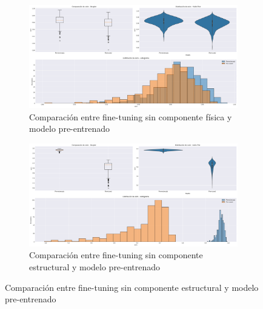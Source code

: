 \begin{figure}[H]
    \centering
    \begin{subfigure}[b]{0.48\textwidth}
        \centering
        \includegraphics[width=\textwidth]{Images/comparison_plots_ssim_no_phy.png}
        \caption{Comparación entre fine-tuning sin componente física y modelo pre-entrenado}
        \label{fig:ssim_hist}
    \end{subfigure}
    \hfill
    \begin{subfigure}[b]{0.48\textwidth}
        \centering
        \includegraphics[width=\textwidth]{Images/comparison_plots_ssim_no_struct.png}
        \caption{Comparación entre fine-tuning sin componente estructural y modelo pre-entrenado}
        \label{fig:ssim_violin}
    \end{subfigure}
    
    \vspace{0.5cm}
    

\end{figure}
